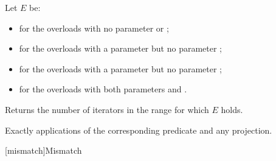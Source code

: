 \begin{itemdescr}
\pnum
Let $E$ be:
\begin{itemize}
\item
   for the overloads
  with no parameter  or ;
\item
   for the overloads
  with a parameter  but no parameter ;
\item
   for the overloads
  with a parameter  but no parameter ;
\item
   for the overloads
  with both parameters  and .
\end{itemize}

\pnum
\effects
Returns the number of iterators  in the range 
for which $E$ holds.

\pnum
\complexity
Exactly  applications
of the corresponding predicate and any projection.
\end{itemdescr}

[mismatch]{Mismatch}

